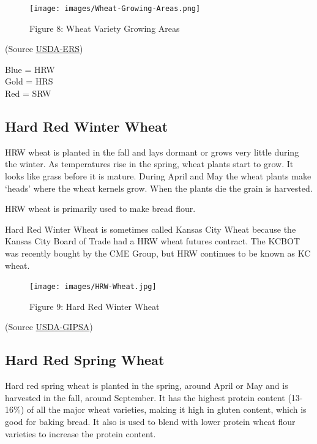 \documentclass[
]{book}
\begin{document}
\begin{figure}
\centering
\texttt{[image: images/Wheat-Growing-Areas.png]}
\caption{Figure 8: Wheat Variety Growing Areas}
\end{figure}

(Source \href{https://wayback.archive-it.org/5923/20120310141642/http://ers.usda.gov/Briefing/Wheat/maps.htm}{USDA-ERS})

Blue = HRW\\
Gold = HRS\\
Red = SRW

\hypertarget{hard-red-winter-wheat}{%
\subsection{Hard Red Winter Wheat}\label{hard-red-winter-wheat}}

HRW wheat is planted in the fall and lays dormant or grows very little during the winter. As temperatures rise in the spring, wheat plants start to grow. It looks like grass before it is mature. During April and May the wheat plants make `heads' where the wheat kernels grow. When the plants die the grain is harvested.

HRW wheat is primarily used to make bread flour.

Hard Red Winter Wheat is sometimes called Kansas City Wheat because the Kansas City Board of Trade had a HRW wheat futures contract. The KCBOT was recently bought by the CME Group, but HRW continues to be known as KC wheat.

\begin{figure}
\centering
\texttt{[image: images/HRW-Wheat.jpg]}
\caption{Figure 9: Hard Red Winter Wheat}
\end{figure}

(Source \href{https://www.gipsa.usda.gov/fgis/commgallery/gr_hrw.aspx}{USDA-GIPSA})

\hypertarget{hard-red-spring-wheat}{%
\subsection{Hard Red Spring Wheat}\label{hard-red-spring-wheat}}

Hard red spring wheat is planted in the spring, around April or May and is harvested in the fall, around September. It has the highest protein content (13-16\%) of all the major wheat varieties, making it high in gluten content, which is good for baking bread. It also is used to blend with lower protein wheat flour varieties to increase the protein content.
\end{document}
